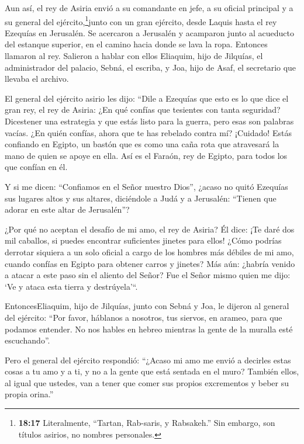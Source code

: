  Aun así, el rey de Asiria envió a su comandante en jefe, a
su oficial principal y a su general del ejército,\footnote{\textbf{18:17}
  Literalmente, ``Tartan, Rab-saris, y Rabsakeh.'' Sin embargo, son
  títulos asirios, no nombres personales.}junto con un gran ejército,
desde Laquis hasta el rey Ezequías en Jerusalén. Se acercaron a
Jerusalén y acamparon junto al acueducto del estanque superior, en el
camino hacia donde se lava la ropa.  Entonces llamaron al
rey. Salieron a hablar con ellos Eliaquim, hijo de Jilquías, el
administrador del palacio, Sebná, el escriba, y Joa, hijo de Asaf, el
secretario que llevaba el archivo.

 El general del ejército asirio les dijo: ``Dile a Ezequías
que esto es lo que dice el gran rey, el rey de Asiria: ¿En qué confías
que tesientes con tanta seguridad?  Dicestener una
estrategia y que estás listo para la guerra, pero esas son palabras
vacías. ¿En quién confías, ahora que te has rebelado contra mí?
 ¡Cuidado! Estás confiando en Egipto, un bastón que es como
una caña rota que atravesará la mano de quien se apoye en ella. Así es
el Faraón, rey de Egipto, para todos los que confían en él.

 Y si me dicen: ``Confiamos en el Señor nuestro Dios'',
¿acaso no quitó Ezequías sus lugares altos y sus altares, diciéndole a
Judá y a Jerusalén: ``Tienen que adorar en este altar de Jerusalén''?

 ¿Por qué no aceptan el desafío de mi amo, el rey de
Asiria? Él dice: ¡Te daré dos mil caballos, si puedes encontrar
suficientes jinetes para ellos!  ¿Cómo podrías derrotar
siquiera a un solo oficial a cargo de los hombres más débiles de mi amo,
cuando confías en Egipto para obtener carros y jinetes? 
Más aún: ¿habría venido a atacar a este paso sin el aliento del Señor?
Fue el Señor mismo quien me dijo: `Ve y ataca esta tierra y
destrúyela'``.

 EntoncesEliaquim, hijo de Jilquías, junto con Sebná y Joa,
le dijeron al general del ejército: ``Por favor, háblanos a nosotros,
tus siervos, en arameo, para que podamos entender. No nos hables en
hebreo mientras la gente de la muralla esté escuchando''.

 Pero el general del ejército respondió: ``¿Acaso mi amo me
envió a decirles estas cosas a tu amo y a ti, y no a la gente que está
sentada en el muro? También ellos, al igual que ustedes, van a tener que
comer sus propios excrementos y beber su propia orina.''

